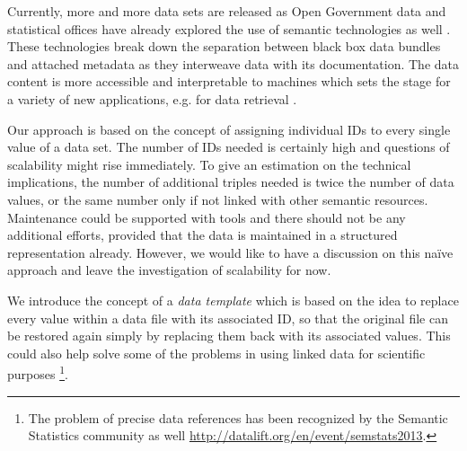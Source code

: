 \documentclass{acm_proc_article-sp}
\begin{document}
Currently, more and more data sets are released as Open Government data and statistical offices have already explored the use of semantic technologies as well \cite{Halb_LDOW08}.
These technologies break down the separation between black box data bundles and attached metadata as they interweave data with its documentation.
The data content is more accessible and interpretable to machines which sets the stage for a variety of new applications, e.g. for data retrieval \cite{BahlsTochtermann_2012}.

Our approach is based on the concept of assigning individual IDs to every single value of a data set.
The number of IDs needed is certainly high and questions of scalability might rise immediately.
To give an estimation on the technical implications, the number of additional triples needed is twice the number of data values, or the same number only if not linked with other semantic resources.
Maintenance could be supported with tools and there should not be any additional efforts, provided that the data is maintained in a structured representation already.
However, we would like to have a discussion on this naïve approach and leave the investigation of scalability for now.

We introduce the concept of a \textit{data template} which is based on the idea to replace every value within a data file with its associated ID, so that the original file can be restored again simply by replacing them back with its associated values.
This could also help solve some of the problems in using linked data for scientific purposes \cite{bechhofer2010linked}\footnote{The problem of precise data references has been recognized by the Semantic Statistics community as well \url{http://datalift.org/en/event/semstats2013}.}.
\end{document}
